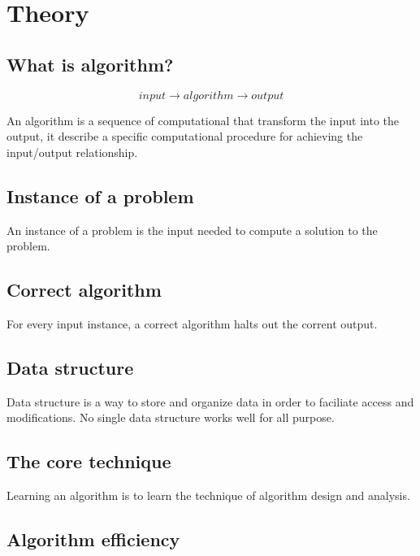 
\chapter{Theory}

\section{What is algorithm?}

\begin{tcolorbox}
  \begin{equation*}
    input \longrightarrow algorithm \longrightarrow output    
  \end{equation*}
\end{tcolorbox}


An algorithm is a sequence of computational that transform the input into the output, it describe a specific computational procedure for achieving the input/output relationship.


\section{Instance of a problem}

An instance of a problem is the input needed to compute a solution to the problem.

\section{Correct algorithm}

For every input instance, a correct algorithm halts out the corrent output.

\section{Data structure}

Data structure is a way to store and organize data in order to faciliate access and modifications.
No single data structure works well for all purpose.

\section{The core technique}

Learning an algorithm is to learn the technique of algorithm design and analysis.

\section{Algorithm efficiency}

